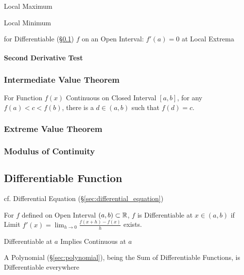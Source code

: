 Local Maximum

Local Minimum

for Differentiable (\S\ref{sec:differentiable_function}) $f$ on an
Open Interval: $f'(a) = 0$ at Local Extrema



\paragraph{Second Derivative Test}\label{sec:second_derivative_test}\hfill



\subsubsection{Intermediate Value Theorem}
\label{sec:intermediate_value}

For Function $f(x)$ Continuous on Closed Interval $[a,b]$, for any
$f(a) < c < f(b)$, there is a $d \in (a,b)$ such that $f(d) = c$.



\subsubsection{Extreme Value Theorem}\label{sec:extreme_value}

\subsubsection{Modulus of Continuity}\label{sec:continuity_modulus}



\subsection{Differentiable Function}\label{sec:differentiable_function}

cf. Differential Equation (\S\ref{sec:differential_equation})

For $f$ defined on Open Interval $(a,b) \subset \mathbb{R}$, $f$ is
Differentiable at $x \in (a,b)$ if Limit $f'(x) = \lim_{h \rightarrow
  0} \frac{f (x+h) - f(x)}{h}$ exists.

Differentiable at $a$ Implies Continuous at $a$

A Polynomial (\S\ref{sec:polynomial}), being the Sum of Differentiable
Functions, is Differentiable everywhere

